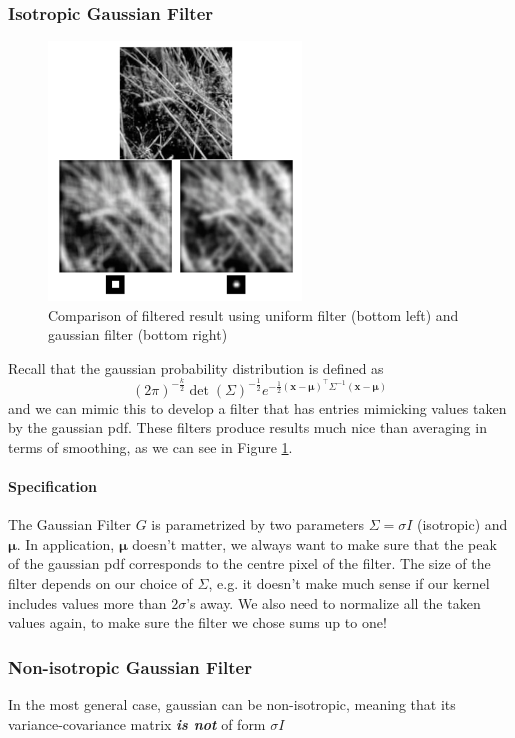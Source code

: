 \documentclass[11pt]{article}
\begin{document}
\subsubsection{Isotropic Gaussian Filter}
\begin{figure}[H]
	\center\includegraphics[width=0.6\textwidth]{figs/filter_comp}
	\caption{Comparison of filtered result using uniform filter (bottom left) and gaussian filter (bottom right)}
	\label{fig:filter_comp}
\end{figure}
Recall that the gaussian probability distribution is defined as 
\begin{equation}
	(2 \pi)^{-\frac{k}{2}} \operatorname{det}(\Sigma)^{-\frac{1}{2}} e^{-\frac{1}{2}(\mathbf{x}-\boldsymbol{\mu})^{\top} \Sigma^{-1}(\mathbf{x}-\boldsymbol{\mu})}
\end{equation}
and we can mimic this to develop a filter that has entries mimicking values taken by the gaussian pdf. These filters produce results much nice than averaging in terms of smoothing, as we can see in Figure \ref{fig:filter_comp}.

\paragraph{Specification} The Gaussian Filter $G$ is parametrized by two parameters $\Sigma = \sigma I$ (isotropic) and $\boldsymbol{\mu}$. In application, $\boldsymbol{\mu}$ doesn't matter, we always want to make sure that the peak of the gaussian pdf corresponds to the centre pixel of the filter. The size of the filter depends on our choice of $\Sigma$, e.g. it doesn't make much sense if our kernel includes values more than $2\sigma$'s away. We also need to normalize all the taken values again, to make sure the filter we chose sums up to one!

\subsubsection{Non-isotropic Gaussian Filter}
In the most general case, gaussian can be non-isotropic, meaning that its variance-covariance matrix \textit{\textbf{is not}} of form $\sigma I$ 
\end{document}
